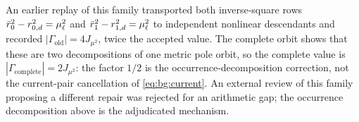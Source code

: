 \begin{remark}\label{rem:bg:occurrence}
An earlier replay of this family transported both inverse-square rows $\bar r_{0}^{2}-r_{0,d}^{2}=\mu_\ell^{2}$ and
$\bar r_{1}^{2}-r_{1,d}^{2}=\mu_\ell^{2}$ to independent nonlinear descendants and recorded
$|\Gamma_{\mathrm{old}}|=4J_{\mu^{2}}$, twice the accepted value. The complete orbit shows that these are two
decompositions of one metric pole orbit, so the complete value is $|\Gamma_{\mathrm{complete}}|=2J_{\mu^{2}}$: the
factor $1/2$ is the occurrence-decomposition correction, not the current-pair cancellation of
\eqref{eq:bg:current}. An external review of this family proposing a different repair was rejected for an
arithmetic gap; the occurrence decomposition above is the adjudicated mechanism.
\end{remark}

